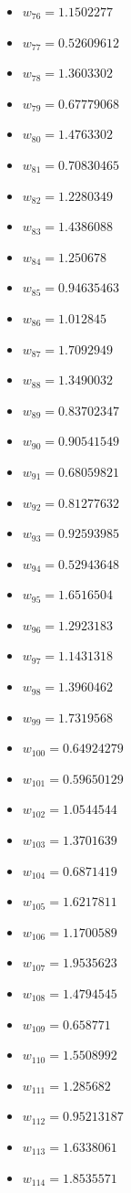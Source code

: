 \documentclass[11pt]{article}
\begin{document}
\begin{itemize}
\item $w_{76} = 1.1502277$
\item $w_{77} = 0.52609612$
\item $w_{78} = 1.3603302$
\item $w_{79} = 0.67779068$
\item $w_{80} = 1.4763302$
\item $w_{81} = 0.70830465$
\item $w_{82} = 1.2280349$
\item $w_{83} = 1.4386088$
\item $w_{84} = 1.250678$
\item $w_{85} = 0.94635463$
\item $w_{86} = 1.012845$
\item $w_{87} = 1.7092949$
\item $w_{88} = 1.3490032$
\item $w_{89} = 0.83702347$
\item $w_{90} = 0.90541549$
\item $w_{91} = 0.68059821$
\item $w_{92} = 0.81277632$
\item $w_{93} = 0.92593985$
\item $w_{94} = 0.52943648$
\item $w_{95} = 1.6516504$
\item $w_{96} = 1.2923183$
\item $w_{97} = 1.1431318$
\item $w_{98} = 1.3960462$
\item $w_{99} = 1.7319568$
\item $w_{100} = 0.64924279$
\item $w_{101} = 0.59650129$
\item $w_{102} = 1.0544544$
\item $w_{103} = 1.3701639$
\item $w_{104} = 0.6871419$
\item $w_{105} = 1.6217811$
\item $w_{106} = 1.1700589$
\item $w_{107} = 1.9535623$
\item $w_{108} = 1.4794545$
\item $w_{109} = 0.658771$
\item $w_{110} = 1.5508992$
\item $w_{111} = 1.285682$
\item $w_{112} = 0.95213187$
\item $w_{113} = 1.6338061$
\item $w_{114} = 1.8535571$

\end{itemize}
\end{document}
